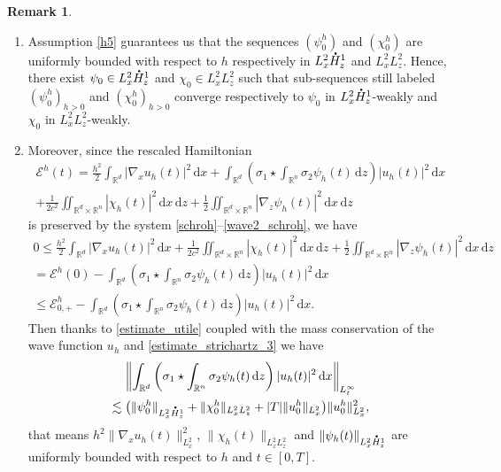 \documentclass[10pt]{amsart}
\newenvironment{enumeratei}
{\bgroup\def\theenumi{\roman{enumi}}\def\theenumii{\arabic{enumii}}\begin{enumerate}}
{\end{enumerate}\egroup}
\theoremstyle{definition}
\newtheorem{rmk}[lemma]{Remark}
\newcommand*{\overbigdot}[1]{%
\accentset{\mbox{\large\bfseries .}}{#1}}
\newcommand{\R}{\mathbb{R}}
\newcommand{\ud}{\, {\mathrm{d}}}
\begin{document}
\skpt
\begin{rmk}\label{rmk_h5}
\begin{enumeratei}
\item
Assumption \eqref{h5} guarantees us that the sequences $(\psi_{0}^{h})$ and $(\chi_{0}^{h})$ are uniformly bounded with respect to $h$ respectively in $L_{x}^{2}\overbigdot{H}_{z}^{1}$ and $L_{x}^{2}L_{z}^{2}$. Hence, there exist $\psi_{0}\in L_{x}^{2}\overbigdot{H}_{z}^{1}$ and $\chi_{0}\in L_{x}^{2}L_{z}^{2}$ such that sub-sequences still labeled $(\psi_{0}^{h})_{h>0}$ and $(\chi_{0}^{h})_{h>0}$ converge respectively to $\psi_{0}$ in $L_{x}^{2}\overbigdot{H}_{z}^{1}$-weakly and $\chi_{0}$ in $L_{x}^{2}L_{z}^{2}$-weakly.

\item
Moreover, since the rescaled Hamiltonian
\begin{multline*}
\mathscr{E}^{h}(t)=\frac{h^{2}}{2}\int_{\R^{d}}|\nabla_{x}u_{h}(t)|^{2}\ud x+\int_{\R^{d}}\left(\sigma_{1}\star\int_{\R^{n}}\sigma_{2}\psi_{h}(t)\ud z\right)|u_{h}(t)|^{2}\ud x\\
+\frac{1}{2c^{2}}\iint_{\R^{d}\times\R^{n}}|\chi_{h}(t)|^{2}\ud x\ud z+\frac{1}{2}\iint_{\R^{d}\times\R^{n}}|\nabla_{z}\psi_{h}(t)|^{2}\ud x\ud z
\end{multline*}
is preserved by the system \eqref{schroh}--\eqref{wave2_schroh}, we have
\bgroup
{}
\begin{multline*}
0\leq\frac{h^{2}}{2}\int_{\R^{d}}|\nabla_{x}u_{h}(t)|^{2}\ud x+\frac{1}{2c^{2}}\iint_{\R^{d}\times\R^{n}}|\chi_{h}(t)|^{2}\ud x\ud z+\frac{1}{2}\iint_{\R^{d}\times\R^{n}}|\nabla_{z}\psi_{h}(t)|^{2}\ud x\ud z\\
= \mathscr{E}^{h}(0)-\int_{\R^{d}}\left(\sigma_{1}\star\int_{\R^{n}}\sigma_{2}\psi_{h}(t)\ud z\right)|u_{h}(t)|^{2}\ud x\\
\leq \mathscr{E}_{0,+}^{h}-\int_{\R^{d}}\left(\sigma_{1}\star\int_{\R^{n}}\sigma_{2}\psi_{h}(t)\ud z\right)|u_{h}(t)|^{2}\ud x.
\end{multline*}
\egroup
Then thanks to \eqref{estimate_utile} coupled with the mass conservation of the wave function $u_{h}$ and \eqref{estimate_strichartz_3} we have
\begin{multline*}
\left\|\int_{\R^{d}}\left(\sigma_{1}\star\int_{\R^{n}}\sigma_{2}\psi_{h}(t)\ud z\right)|u_{h}(t)|^{2}\ud x\right\|_{L_{t}^{\infty}}\\
\lesssim\bigl(\|\psi_{0}^{h}\|_{L_{x}^{2}\overbigdot{H}_{z}^{1}}+\|\chi_{0}^{h}\|_{L_{x}^{2}L_{z}^{2}}+|T|\|u_{0}^{h}\|_{L_{x}^{2}}\bigr)\|u_{0}^{h}\|_{L_{x}^{2}}^{2},
\end{multline*}
that means $h^{2}\|\nabla_{x}u_{h}(t)\|_{L_{x}^{2}}^{2}$, $\|\chi_{h}(t)\|_{L_{x}^{2}L_{z}^{2}}$ and $\|\psi_{h}(t)\|_{L_{x}^{2}\overbigdot{H}_{z}^{1}}$ are uniformly bounded with respect to $h$ and $t\in[0,T]$.
\end{enumeratei}
\end{rmk}
\end{document}
